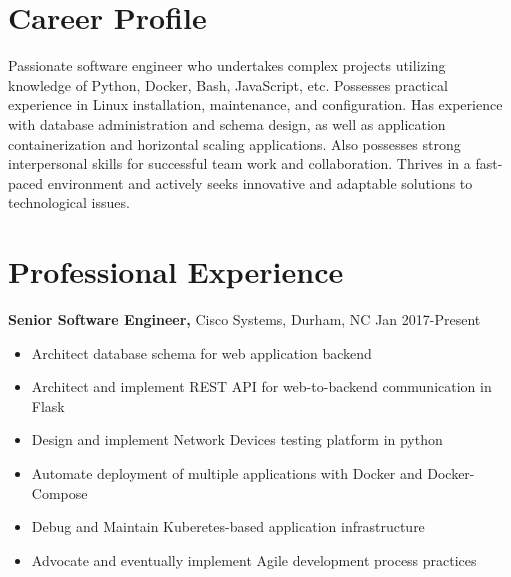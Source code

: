 \documentclass{res}
\begin{document}
 
 
\address{{\bf Present Address} \\ 9210 Bothwell St. Apt. 103 \\ Raleigh, NC 27617  \\
        (336) 681-7224 }
\address{{\bf Permanent Address} \\ 114 East Keeling Rd \\ Greensborbo, NC 27410}
 
\begin{resume} 

\noindent\makebox[5.5in]{\rule{6.5in}{0.4pt}}


\section{Career Profile} 
  Passionate software engineer who undertakes complex projects utilizing knowledge of Python, Docker, Bash, JavaScript, etc. Possesses practical experience in Linux installation, maintenance, and configuration. Has experience with database administration and schema design, as well as application containerization and horizontal scaling applications. Also possesses strong interpersonal skills for successful team work and collaboration. Thrives in a fast-paced environment and actively seeks innovative and adaptable solutions to technological issues.
\section{Professional Experience}
  {\bf Senior Software Engineer,} Cisco Systems, Durham, NC \hfill Jan 2017-Present
    \begin{itemize} \itemsep -2pt
      \item Architect database schema for web application backend
      \item Architect and implement REST API for web-to-backend communication in Flask
      \item Design and implement Network Devices testing platform in python
      \item Automate deployment of multiple applications with Docker and Docker-Compose
      \item Debug and Maintain Kuberetes-based application infrastructure
      \item Advocate and eventually implement Agile development process practices
    \end{itemize}


\end{resume}
\end{document}
